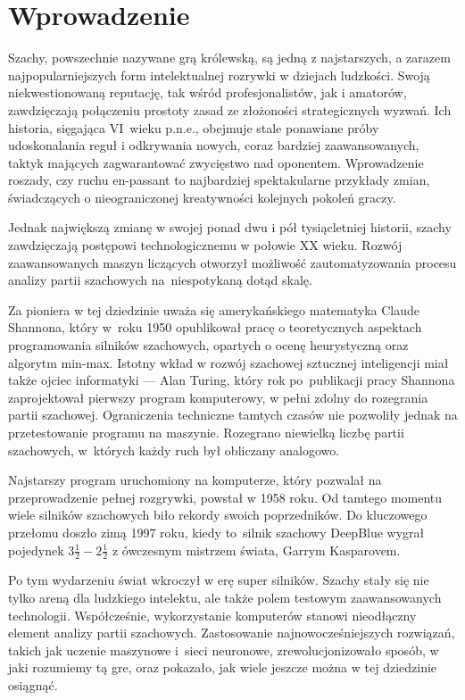 \section{Wprowadzenie}
\label{sec:wprowadzenie}

Szachy, powszechnie nazywane grą królewską, są jedną z najstarszych, a zarazem najpopularniejszych form intelektualnej rozrywki w dziejach ludzkości.
Swoją niekwestionowaną reputację, tak wśród profesjonalistów, jak i amatorów, zawdzięczają połączeniu prostoty zasad ze złożoności strategicznych wyzwań.
Ich historia, sięgająca VI~wieku p.n.e., obejmuje stale ponawiane próby udoskonalania reguł i odkrywania nowych, coraz bardziej zaawansowanych, taktyk mających zagwarantować zwycięstwo nad oponentem.
Wprowadzenie roszady, czy ruchu en-passant to najbardziej spektakularne przykłady zmian, świadczących o nieograniczonej kreatywności kolejnych pokoleń graczy.


Jednak największą zmianę w swojej ponad dwu i pół tysiącletniej historii, szachy zawdzięczają postępowi technologicznemu w połowie XX wieku.
Rozwój zaawansowanych maszyn liczących otworzył możliwość zautomatyzowania procesu analizy partii szachowych na~niespotykaną dotąd skalę.


Za pioniera w tej dziedzinie uważa się amerykańskiego matematyka Claude Shannona, który w~roku 1950 opublikował pracę o teoretycznych aspektach programowania silników szachowych, opartych o ocenę heurystyczną oraz algorytm min-max.
Istotny wkład w rozwój szachowej sztucznej inteligencji miał także ojciec informatyki — Alan Turing, który rok po~publikacji pracy Shannona zaprojektował pierwszy program komputerowy, w pełni zdolny do rozegrania partii szachowej.
Ograniczenia techniczne tamtych czasów nie pozwoliły jednak na przetestowanie programu na maszynie.
Rozegrano niewielką liczbę partii szachowych, w~których każdy ruch był obliczany analogowo.


Najstarszy program uruchomiony na komputerze, który pozwalał na przeprowadzenie pełnej rozgrywki, powstał w 1958 roku.
Od tamtego momentu wiele silników szachowych biło rekordy swoich poprzedników.
Do kluczowego przełomu doszło zimą 1997 roku, kiedy to~silnik szachowy DeepBlue wygrał pojedynek $3\frac{1}{2} - 2\frac{1}{2}$ z ówczesnym mistrzem świata, Garrym Kasparovem.


Po tym wydarzeniu świat wkroczył w erę super silników.
Szachy stały się nie tylko areną dla ludzkiego intelektu, ale także polem testowym zaawansowanych technologii.
Współcześnie, wykorzystanie komputerów stanowi nieodłączny element analizy partii szachowych.
Zastosowanie najnowocześniejszych rozwiązań, takich jak uczenie maszynowe i~sieci neuronowe, zrewolucjonizowało sposób, w jaki rozumiemy tą gre, oraz pokazało, jak wiele jeszcze można w tej dziedzinie osiągnąć.


